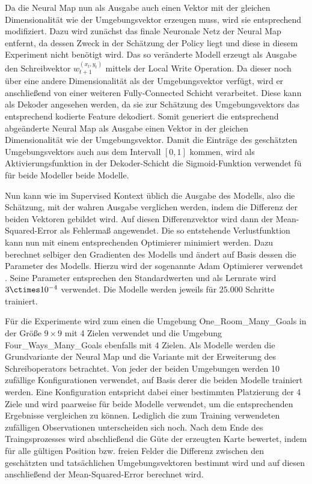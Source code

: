 Da die Neural Map nun als Ausgabe auch einen Vektor mit der gleichen Dimensionalität wie der Umgebungsvektor erzeugen muss, wird sie entsprechend modifiziert. Dazu wird zunächst das finale Neuronale Netz der Neural Map entfernt, da dessen Zweck in der Schätzung der Policy liegt und diese in diesem Experiment nicht benötigt wird. Das so veränderte Modell erzeugt als Ausgabe den Schreibvektor $w_{t+1}^{(x_t,y_t)}$ mittels der Local Write Operation. Da dieser noch über eine andere Dimensionalität als der Umgebungsvektor verfügt, wird er anschließend von einer weiteren Fully-Connected Schicht verarbeitet. Diese kann als Dekoder angesehen werden, da sie zur Schätzung des Umgebungsvektors das entsprechend kodierte Feature dekodiert. Somit generiert die entsprechend abgeänderte Neural Map als Ausgabe einen Vektor in der gleichen Dimensionalität wie der Umgebungsvektor. Damit die Einträge des geschätzten Umgebungsvektors auch aus dem Intervall $[0, 1]$ kommen, wird als Aktivierungsfunktion in der Dekoder-Schicht die Sigmoid-Funktion verwendet fü für beide Modeller beide Modelle.

Nun kann wie im Supervised Kontext üblich die Ausgabe des Modells, also die Schätzung, mit der wahren Ausgabe verglichen werden, indem die Differenz der beiden Vektoren gebildet wird. Auf diesen Differenzvektor wird dann der Mean-Squared-Error als Fehlermaß angewendet. Die so entstehende Verlustfunktion kann nun mit einem entsprechenden Optimierer minimiert werden. Dazu berechnet selbiger den Gradienten des Modells und ändert auf Basis dessen die Parameter des Modells. Hierzu wird der sogenannte Adam Optimierer verwendet \cite{Adam}. Seine Parameter entsprechen den Standardwerten und als Lernrate wird $3\ctimes10^{-4}$ verwendet. Die Modelle werden jeweils für $25.000$ Schritte trainiert.

Für die Experimente wird zum einen die Umgebung \glqq One\_Room\_Many\_Goals\grqq{} in der Größe $9 \times 9$ mit 4 Zielen verwendet und die Umgebung \glqq Four\_Ways\_Many\_Goals\grqq{} ebenfalls mit 4 Zielen. Als Modelle werden die Grundvariante der Neural Map und die Variante mit der Erweiterung des Schreiboperators betrachtet. Von jeder der beiden Umgebungen werden 10 zufällige Konfigurationen verwendet, auf Basis derer die beiden Modelle trainiert werden. Eine Konfiguration entspricht dabei einer bestimmten Platzierung der 4 Ziele und wird paarweise für beide Modelle verwendet, um die entsprechenden Ergebnisse vergleichen zu können. Lediglich die zum Training verwendeten zufälligen Observationen unterscheiden sich noch. Nach dem Ende des Traingsprozesses wird abschließend die Güte der erzeugten Karte bewertet, indem für alle gültigen Position bzw. freien Felder die Differenz zwischen den geschätzten und tatsächlichen Umgebungsvektoren bestimmt wird und auf diesen anschließend der Mean-Squared-Error berechnet wird.

